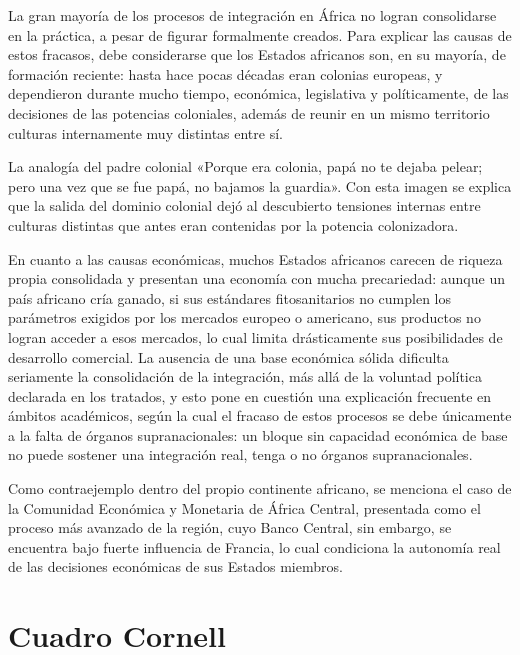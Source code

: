 \documentclass[12pt,oneside]{book}
\begin{document}
La gran mayoría de los procesos de integración en África no logran consolidarse en la práctica, a pesar de figurar formalmente creados. Para explicar las causas de estos fracasos, debe considerarse que los Estados africanos son, en su mayoría, de formación reciente: hasta hace pocas décadas eran colonias europeas, y dependieron durante mucho tiempo, económica, legislativa y políticamente, de las decisiones de las potencias coloniales, además de reunir en un mismo territorio culturas internamente muy distintas entre sí.

\begin{ejemplo}{La analogía del padre colonial}
«Porque era colonia, papá no te dejaba pelear; pero una vez que se fue papá, no bajamos la guardia». Con esta imagen se explica que la salida del dominio colonial dejó al descubierto tensiones internas entre culturas distintas que antes eran contenidas por la potencia colonizadora.
\end{ejemplo}

En cuanto a las causas económicas, muchos Estados africanos carecen de riqueza propia consolidada y presentan una economía con mucha precariedad: aunque un país africano cría ganado, si sus estándares fitosanitarios no cumplen los parámetros exigidos por los mercados europeo o americano, sus productos no logran acceder a esos mercados, lo cual limita drásticamente sus posibilidades de desarrollo comercial. La ausencia de una base económica sólida dificulta seriamente la consolidación de la integración, más allá de la voluntad política declarada en los tratados, y esto pone en cuestión una explicación frecuente en ámbitos académicos, según la cual el fracaso de estos procesos se debe únicamente a la falta de órganos supranacionales: un bloque sin capacidad económica de base no puede sostener una integración real, tenga o no órganos supranacionales.

Como contraejemplo dentro del propio continente africano, se menciona el caso de la Comunidad Económica y Monetaria de África Central, presentada como el proceso más avanzado de la región, cuyo Banco Central, sin embargo, se encuentra bajo fuerte influencia de Francia, lo cual condiciona la autonomía real de las decisiones económicas de sus Estados miembros.

\section{Cuadro Cornell}
\end{document}
